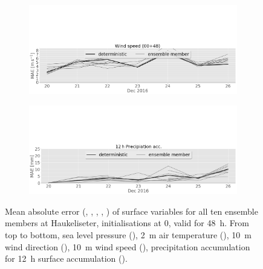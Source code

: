 \begin{figure}[H]
\begin{subfigure}[b]{0.75\textwidth}
		\end{subfigure}
	\centering
        \begin{subfigure}[b]{0.8\textwidth}
			\includegraphics[trim={0cm 0cm 0cm 9.5cm},clip,width=\textwidth]{./fig_sfc_ws/MAE_20161220_26_00}
			\caption{}\label{fig:MAE:ws}
		\end{subfigure}
        \begin{subfigure}[b]{0.8\textwidth}
			\includegraphics[trim={0cm 0cm 0cm 9.5cm},clip,width=\textwidth]{./fig_sfc_precip/MAE12_20161220_26_00}
			\caption{}\label{fig:MAE:precip12}
		\end{subfigure}
	\caption{Mean absolute error (\protect{}, \protect{}, \protect{}, \protect{}, \protect{}) of surface variables for all ten ensemble members at Haukeliseter, initialisations at \SI{0}{\UTC}, valid for \SI{48}{\hour}. From top to bottom, sea level pressure (\protect{}), \SI{2}{\metre} air temperature (\protect{}), \SI{10}{\metre} wind direction (\protect{}), \SI{10}{\metre} wind speed (\protect{}), precipitation accumulation for \SI{12}{\hour} surface accumulation (\protect{}).}\label{fig:MAE}
\end{figure}
